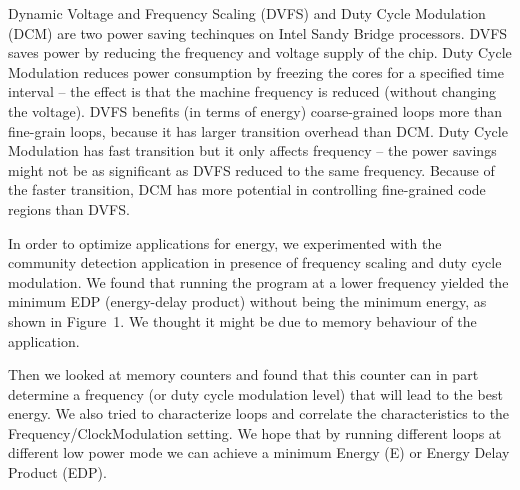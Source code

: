 Dynamic Voltage and Frequency Scaling (DVFS) and Duty Cycle Modulation (DCM)
are two power saving techinques on Intel Sandy Bridge processors. 
DVFS saves power by reducing the frequency and voltage supply of the chip. 
Duty Cycle Modulation reduces power consumption by freezing 
the cores for a specified time interval -- the effect is that the machine frequency
is reduced (without changing the voltage).   
DVFS benefits (in terms of energy) coarse-grained loops more than fine-grain loops,
because it has larger transition overhead than DCM. 
Duty Cycle Modulation has fast transition but it only affects frequency -- 
the power savings might not be as significant as DVFS reduced to the same frequency.
Because of the faster transition, DCM has more potential in controlling fine-grained code regions
than DVFS.

In order to optimize applications for energy, we experimented 
with the community detection application in presence of frequency
scaling and duty cycle modulation. We found that running the program at a 
lower frequency yielded the minimum EDP (energy-delay product) 
without being the minimum energy, as shown in Figure~1.
We thought it might be due to memory behaviour of the application.

Then we looked at memory counters and found that this counter can in part determine a
 frequency (or duty cycle modulation level) that will lead to the best energy.
We also tried to characterize loops and correlate the characteristics to the 
Frequency/ClockModulation setting. We hope that by running different loops at 
different low power mode we can achieve a minimum Energy (E) or Energy Delay Product (EDP).


